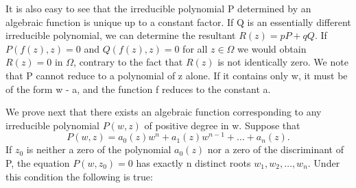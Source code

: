 It is also easy to see that the irreducible polynomial P determined by an algebraic function is unique up to a constant factor. If Q is an essentially different irreducible polynomial, we can determine the resultant $R(z) = pP + qQ$. If $P(f(z), z) = 0$ and $Q(f(z), z) = 0$ for all $z \in \Omega$ we would obtain $R(z) = 0$ in $\Omega$, contrary to the fact that $R(z)$ is not identically zero. We note that P cannot reduce to a polynomial of z alone. If it contains only w, it must be of the form w - a, and the function f reduces to the constant a.

We prove next that there exists an algebraic function corresponding to any irreducible polynomial $P(w,z)$ of positive degree in w. Suppose that
\begin{equation*}
P (w, z) = a _ {0} (z) w ^ {n} + a _ {1} (z) w ^ {n - 1} + \dots + a _ {n} (z).
\end{equation*}
If $z_{0}$ is neither a zero of the polynomial $a_{0}(z)$ nor a zero of the discriminant of P, the equation $P(w,z_{0}) = 0$ has exactly n distinct roots $w_{1}, w_{2}, \ldots, w_{n}$. Under this condition the following is true:

